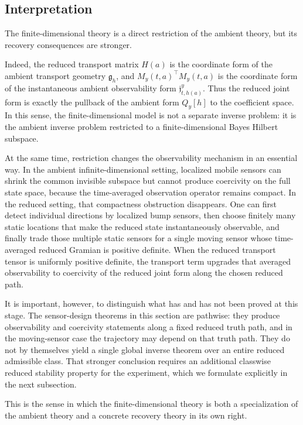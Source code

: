\documentclass{article}
\theoremstyle{definition}
\begin{document}
\subsection{Interpretation}

The finite-dimensional theory is a direct restriction of the ambient theory, but its recovery
consequences are stronger.

Indeed, the reduced transport matrix \(H(a)\) is the coordinate form of the ambient transport
geometry \(\mathfrak g_h\), and \(M_y(t,a)^\top M_y(t,a)\) is the coordinate form of the
instantaneous ambient observability form \(\mathfrak j_{t,h(a)}^y\). Thus the reduced joint form is
exactly the pullback of the ambient form \(Q_y[h]\) to the coefficient space. In this sense, the
finite-dimensional model is not a separate inverse problem: it is the ambient inverse problem
restricted to a finite-dimensional Bayes Hilbert subspace.

At the same time, restriction changes the observability mechanism in an essential way. In the
ambient infinite-dimensional setting, localized mobile sensors can shrink the common invisible
subspace but cannot produce coercivity on the full state space, because the time-averaged
observation operator remains compact. In the reduced setting, that compactness obstruction
disappears. One can first detect individual directions by localized bump sensors, then choose
finitely many static locations that make the reduced state instantaneously observable, and finally
trade those multiple static sensors for a single moving sensor whose time-averaged reduced
Gramian is positive definite. When the reduced transport tensor is uniformly positive definite, the
transport term upgrades that averaged observability to coercivity of the reduced joint form along
the chosen reduced path.

It is important, however, to distinguish what has and has not been proved at this stage.
The sensor-design theorems in this section are pathwise: they produce observability and coercivity
statements along a fixed reduced truth path, and in the moving-sensor case the trajectory may
depend on that truth path. They do not by themselves yield a single global inverse theorem over
an entire reduced admissible class. That stronger conclusion requires an additional classwise
reduced stability property for the experiment, which we formulate explicitly in the next
subsection.

This is the sense in which the finite-dimensional theory is both a specialization of the ambient
theory and a concrete recovery theory in its own right.
\end{document}

